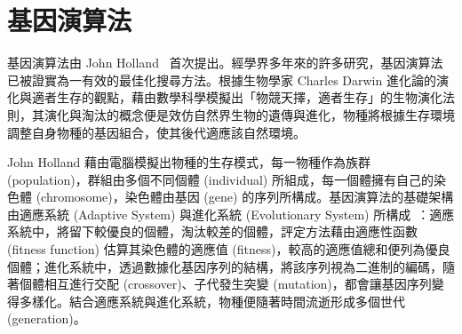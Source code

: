 


\section{基因演算法}
\label{sec:relatedworks-ga}

基因演算法由 John Holland~\cite{holland1992adaptation} 首次提出。經學界多年來的許多研究，基因演算法已被證實為一有效的最佳化搜尋方法。根據生物學家 Charles Darwin 進化論的演化與適者生存的觀點，藉由數學科學模擬出「物競天擇，適者生存」的生物演化法則，其演化與淘汰的概念便是效仿自然界生物的遺傳與進化，物種將根據生存環境調整自身物種的基因組合，使其後代適應該自然環境。

John Holland 藉由電腦模擬出物種的生存模式，每一物種作為族群 (population)，群組由多個不同個體 (individual) 所組成，每一個體擁有自己的染色體 (chromosome)，染色體由基因 (gene) 的序列所構成。基因演算法的基礎架構由適應系統 (Adaptive System) 與進化系統 (Evolutionary System) 所構成~\cite{holland1992adaptation}：適應系統中，將留下較優良的個體，淘汰較差的個體，評定方法藉由適應性函數 (fitness function) 估算其染色體的適應值 (fitness)，較高的適應值總和便列為優良個體；進化系統中，透過數據化基因序列的結構，將該序列視為二進制的編碼，隨著個體相互進行交配 (crossover)、子代發生突變 (mutation)，都會讓基因序列變得多樣化。結合適應系統與進化系統，物種便隨著時間流逝形成多個世代 (generation)。


